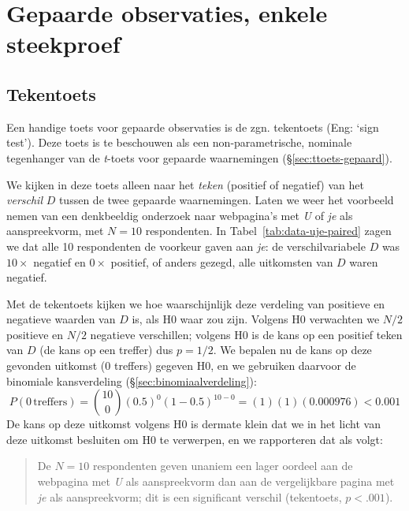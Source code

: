\documentclass[
]{book}
\begin{document}
\section{Gepaarde observaties, enkele steekproef}\label{gepaarde-observaties-enkele-steekproef}

\subsection{Tekentoets}\label{sec:tekentoets}

Een handige toets voor gepaarde observaties is de zgn. tekentoets (Eng: `sign test').
Deze toets is te beschouwen als een non-parametrische, nominale tegenhanger
van de \emph{t}-toets voor gepaarde waarnemingen
(§\ref{sec:ttoets-gepaard}).

We kijken in deze toets alleen naar het \emph{teken} (positief of negatief)
van het \emph{verschil} \(D\) tussen de twee gepaarde waarnemingen. Laten we
weer het voorbeeld nemen van een denkbeeldig onderzoek naar webpagina's
met \emph{U} of \emph{je} als aanspreekvorm, met \(N=10\) respondenten. In
Tabel~\ref{tab:data-uje-paired} zagen we dat alle 10 respondenten de
voorkeur gaven aan \emph{je}: de verschilvariabele \(D\) was \(10\times\)
negatief en \(0\times\) positief, of anders gezegd, alle uitkomsten van
\(D\) waren negatief.

Met de tekentoets kijken we hoe waarschijnlijk deze verdeling van
positieve en negatieve waarden van \(D\) is, als H0 waar zou zijn. Volgens
H0 verwachten we \(N/2\) positieve en \(N/2\) negatieve verschillen; volgens
H0 is de kans op een positief teken van \(D\) (de kans op een treffer) dus
\(p=1/2\). We bepalen nu de kans op deze gevonden uitkomst (0 treffers)
gegeven H0, en we gebruiken daarvoor de binomiale kansverdeling
(§\ref{sec:binomiaalverdeling}):
\begin{equation}
  \label{eq:prob-binom-uje}
    P(0\,\mbox{treffers}) = {10 \choose 0} (0.5)^0 (1-0.5)^{10-0} = (1) (1) (0.000976) < 0.001
\end{equation}
De kans op deze uitkomst volgens H0 is dermate klein dat we in het licht
van deze uitkomst besluiten om H0 te verwerpen, en we rapporteren dat
als volgt:

\begin{quote}
De \(N=10\) respondenten geven unaniem een lager oordeel aan de
webpagina met \emph{U} als aanspreekvorm dan aan de vergelijkbare pagina
met \emph{je} als aanspreekvorm; dit is een significant verschil
(tekentoets, \(p<.001\)).
\end{quote}
\end{document}
